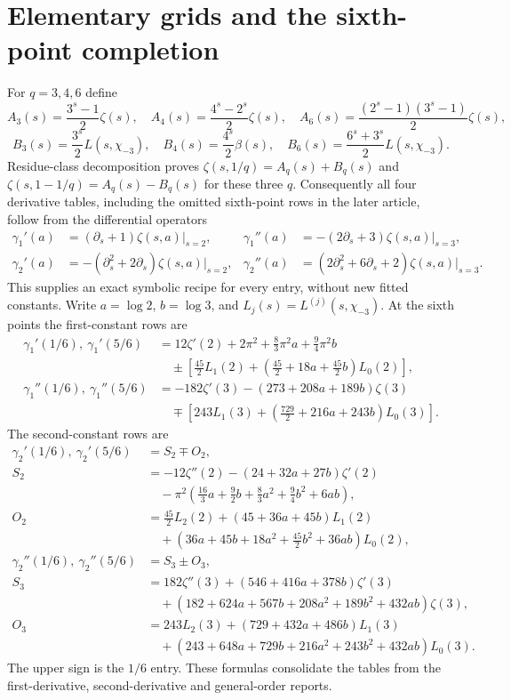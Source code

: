 \section{Elementary grids and the sixth-point completion}
For $q=3,4,6$ define
\[
A_3(s)=\frac{3^s-1}{2}\zeta(s),\quad
A_4(s)=\frac{4^s-2^s}{2}\zeta(s),\quad
A_6(s)=\frac{(2^s-1)(3^s-1)}2\zeta(s),
\]
\[
B_3(s)=\frac{3^s}{2}L(s,\chi_{-3}),\quad
B_4(s)=\frac{4^s}{2}\beta(s),\quad
B_6(s)=\frac{6^s+3^s}{2}L(s,\chi_{-3}).
\]
Residue-class decomposition proves
$\zeta(s,1/q)=A_q(s)+B_q(s)$ and
$\zeta(s,1-1/q)=A_q(s)-B_q(s)$ for these three $q$.
Consequently all four derivative tables, including the omitted sixth-point
rows in the later article, follow from the differential operators
\begin{align*}
\gamma_1'(a)&=(\partial_s+1)\zeta(s,a)|_{s=2},&
\gamma_1''(a)&=-(2\partial_s+3)\zeta(s,a)|_{s=3},\\
\gamma_2'(a)&=-(\partial_s^2+2\partial_s)\zeta(s,a)|_{s=2},&
\gamma_2''(a)&=(2\partial_s^2+6\partial_s+2)\zeta(s,a)|_{s=3}.
\end{align*}
This supplies an exact symbolic recipe for every entry, without new fitted
constants. Write $a=\log2$, $b=\log3$, and $L_j(s)=L^{(j)}(s,\chi_{-3})$.
At the sixth points the first-constant rows are
\begin{align*}
\gamma_1'(1/6),\ \gamma_1'(5/6)
&=12\zeta'(2)+2\pi^2+\frac83\pi^2a+\frac94\pi^2b\\
&\quad\pm\left[\frac{45}{2}L_1(2)
+\left(\frac{45}{2}+18a+\frac{45}{2}b\right)L_0(2)\right],\\
\gamma_1''(1/6),\ \gamma_1''(5/6)
&=-182\zeta'(3)-(273+208a+189b)\zeta(3)\\
&\quad\mp\left[243L_1(3)
+\left(\frac{729}{2}+216a+243b\right)L_0(3)\right].
\end{align*}
The second-constant rows are
\begin{align*}
\gamma_2'(1/6),\ \gamma_2'(5/6)&=S_2\mp O_2,\\
S_2&=-12\zeta''(2)-(24+32a+27b)\zeta'(2)\\
&\quad-\pi^2\left(\frac{16}3a+\frac92b+
\frac83a^2+\frac94b^2+6ab\right),\\
O_2&=\frac{45}{2}L_2(2)+(45+36a+45b)L_1(2)\\
&\quad+\left(36a+45b+18a^2+\frac{45}{2}b^2+36ab\right)L_0(2),\\
\gamma_2''(1/6),\ \gamma_2''(5/6)&=S_3\pm O_3,\\
S_3&=182\zeta''(3)+(546+416a+378b)\zeta'(3)\\
&\quad+(182+624a+567b+208a^2+189b^2+432ab)\zeta(3),\\
O_3&=243L_2(3)+(729+432a+486b)L_1(3)\\
&\quad+(243+648a+729b+216a^2+243b^2+432ab)L_0(3).
\end{align*}
The upper sign is the $1/6$ entry. These formulas consolidate the tables
from the first-derivative, second-derivative and general-order reports.
